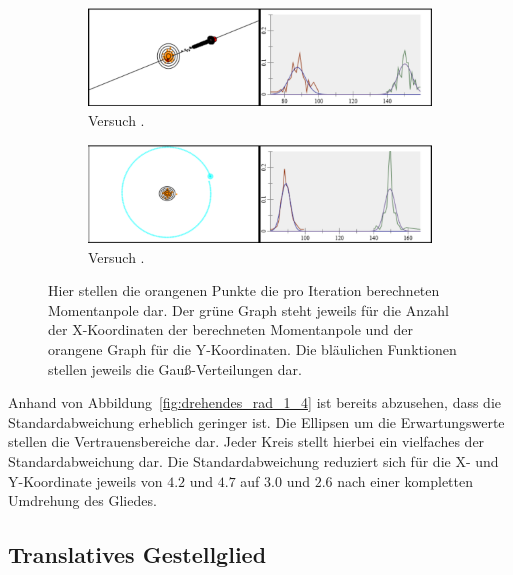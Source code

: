 \begin{figure}
    \centering
    \begin{subfigure}[t]{0.45\textwidth}
        \includegraphics[width=\textwidth]{gfx/drehendes_pendel_1.png}
        \caption{Versuch .}\label{fig:drehendes_pendel_1}
    \end{subfigure}
    \begin{subfigure}[t]{0.45\textwidth}
        \includegraphics[width=\textwidth]{gfx/drehendes_pendel_4.png}
        \caption{Versuch .}\label{fig:drehendes_pendel_4}
    \end{subfigure}
    \caption[Versuche  und ]{Hier stellen die orangenen Punkte die pro Iteration berechneten Momentanpole dar. Der grüne Graph steht jeweils für die Anzahl der X-Koordinaten der berechneten Momentanpole und der orangene Graph für die Y-Koordinaten. Die bläulichen Funktionen stellen jeweils die Gau{\ss}-Verteilungen dar.}
    \label{fig:drehendes_pendel_1_4}
\end{figure}

Anhand von Abbildung~\ref{fig:drehendes_rad_1_4} ist bereits abzusehen, dass die Standardabweichung erheblich geringer ist.
Die Ellipsen um die Erwartungswerte stellen die Vertrauensbereiche dar.
Jeder Kreis stellt hierbei ein vielfaches der Standardabweichung dar.
Die Standardabweichung reduziert sich für die X- und Y-Koordinate jeweils von $4.2$ und $4.7$ auf $3.0$ und $2.6$ nach einer kompletten Umdrehung des Gliedes. 

\subsection{Translatives Gestellglied}

